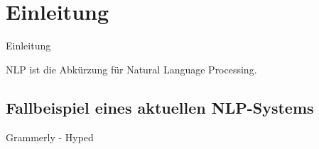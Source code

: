 \chapter{Einleitung}\label{ch:intro}

Einleitung

NLP ist die Abkürzung für Natural Language Processing.


\section{Fallbeispiel eines aktuellen NLP-Systems}

Grammerly - Hyped